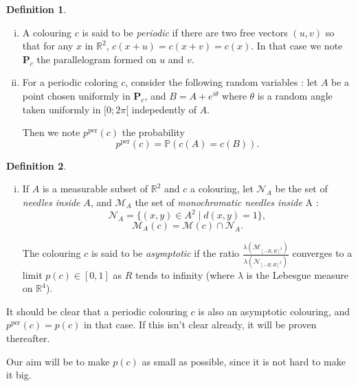 \documentclass[a4paper,11pt]{article}
\theoremstyle{definition}
\newtheorem{definition}{Definition}
\theoremstyle{remark}
\newcommand{\R}{\mathbb{R}}
\newcommand{\M}{\mathcal{M}}
\newcommand{\N}{\mathcal{N}}
\renewcommand{\Pr}{\mathbb{P}}
\renewcommand{\P}{\mathbf{P}}
\newcommand{\pper}{p^{\mathrm{per}}}
\begin{document}
\begin{definition}
\
\begin{enumerate}[i)] 
\item A colouring $c$ is said to be \textit{periodic} if there are two free
vectors $(u,v)$ so that for any $x$ in $\R ^2$, $c(x+u)=c(x+v)=c(x)$. In that
case we note $\P_c$ the parallelogram formed on $u$ and $v$.
\item For a periodic coloring $c$, consider the following random variables :
let $A$ be a point chosen uniformly in $\P_c$, and $B=A + e^{i \theta}$ where
$\theta$ is a random angle taken uniformly in $[0;2 \pi[$ indepedently of $A$.

Then we note $\pper(c)$ the probability
$$\pper(c) = \Pr(c(A)=c(B)).$$
\end{enumerate}
\end{definition}

\begin{definition}
\
\begin{enumerate}[i)] 
\item If $A$ is a measurable subset of $\R^2$ and $c$ a colouring, let $\N_A$ be
the set of \textit{needles inside} $A$, and $\M_A$ the set of \textit{monochromatic
needles inside} A :
\[\N_A = \{(x,y) \in A ^2 \mid d(x,y)=1\}, \]
\[\M_A (c) = \M (c) \cap \N_A. \]

The colouring $c$ is said to be \textit{asymptotic} if the ratio
$\frac{\lambda (\M_{[-R;R]^2})}{\lambda (\N_{[-R;R]^2})}$ 
converges to a limit $p(c) \in [0,1]$ as $R$ tends to infinity (where $\lambda$ 
is the Lebesgue measure on $\mathbb{R}^4$).
\end{enumerate}
\end{definition}

It should be clear that a periodic colouring $c$ is also an asymptotic colouring,
and $\pper(c)=p(c)$ in that case. If this isn't clear already, it will be proven
thereafter.

Our aim will be to make $p(c)$ as small as possible, since it is not hard
to make it big.
\\
\end{document}
